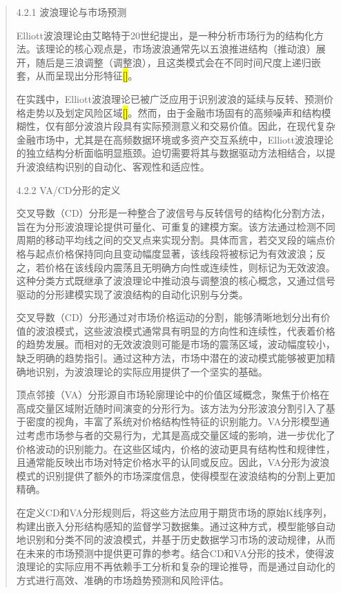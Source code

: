 \begin{quote}
4.2.1 波浪理论与市场预测

Elliott波浪理论由艾略特于20世纪提出，是一种分析市场行为的结构化方法。该理论的核心观点是，市场波浪通常先以五浪推进结构（推动浪）展开，随后是三浪调整（调整浪），且这类模式会在不同时间尺度上递归嵌套，从而呈现出分形特征\hl{{[}{]}}。

在实践中，Elliott波浪理论已被广泛应用于识别波浪的延续与反转、预测价格走势以及划定风险区域\hl{{[}{]}}。然而，由于金融市场固有的高频噪声和结构模糊性，仅有部分波浪片段具有实际预测意义和交易价值。因此，在现代复杂金融市场中，尤其是在高频数据环境或多资产交互系统中，Elliott波浪理论的独立结构分析面临明显瓶颈。迫切需要将其与数据驱动方法相结合，以提升波浪结构识别的自动化、客观性和适应性。

4.2.2 VA/CD分形的定义

交叉导数（CD）分形是一种整合了波信号与反转信号的结构化分割方法，旨在为分形波浪理论提供可量化、可重复的建模方案。该方法通过检测不同周期的移动平均线之间的交叉点来实现分割。具体而言，若交叉段的端点价格与起点价格保持同向且变动幅度显著，该线段将被标记为有效波浪；反之，若价格在该线段内震荡且无明确方向性或连续性，则标记为无效波浪。这种分类方式既继承了波浪理论中推动浪与调整浪的核心概念，又通过信号驱动的分形建模实现了波浪结构的自动化识别与分类。

交叉导数（CD）分形通过对市场价格运动的分割，能够清晰地划分出有价值的波浪模式，这些波浪模式通常具有明显的方向性和连续性，代表着价格的趋势发展。而相对的无效波浪则可能是市场的震荡区域，波动幅度较小，缺乏明确的趋势指引。通过这种方法，市场中潜在的波动模式能够被更加精确地识别，为波浪理论的实际应用提供了一个坚实的基础。

顶点邻接（VA）分形源自市场轮廓理论中的价值区域概念，聚焦于价格在高成交量区域附近随时间演变的分形行为。该方法为分形波浪分割引入了基于密度的视角，丰富了系统对价格结构性特征的识别能力。VA分形模型通过考虑市场参与者的交易行为，尤其是高成交量区域的影响，进一步优化了价格波动的识别能力。在这些区域内，价格的波动更具有结构性和规律性，且通常能反映出市场对特定价格水平的认同或反应。因此，VA分形为波浪模式的识别提供了额外的市场深度信息，使得模型在波浪结构的分割上更加精确。

在定义CD和VA分形规则后，将这些方法应用于期货市场的原始K线序列，构建出嵌入分形结构感知的监督学习数据集。通过这种方式，模型能够自动地识别和分类不同的波浪模式，并基于历史数据学习市场的波动规律，从而在未来的市场预测中提供更可靠的参考。结合CD和VA分形的技术，使得波浪理论的实际应用不再依赖手工分析和复杂的理论推导，而是通过自动化的方式进行高效、准确的市场趋势预测和风险评估。
\end{quote}

